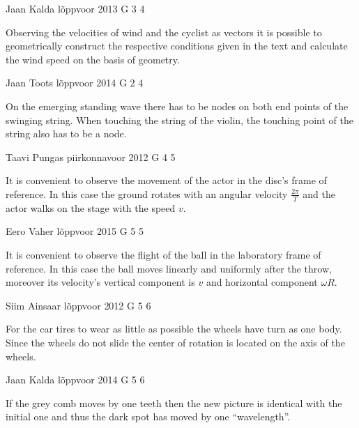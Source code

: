 \documentclass[11pt]{article}
\begin{document}
{Jaan Kalda} %
{lõppvoor} %
{2013} %
{G 3} %
{4} %
{

\ifEngHint
Observing the velocities of wind and the cyclist as vectors it is possible to geometrically construct the respective conditions given in the text and calculate the wind speed on the basis of geometry.
\fi
}

{Jaan Toots} %
{lõppvoor} %
{2014} %
{G 2} %
{4} %
{

\ifEngHint
On the emerging standing wave there has to be nodes on both end points of the swinging string. When touching the string of the violin, the touching point of the string also has to be a node.
\fi
}

{Taavi Pungas} %
{piirkonnavoor} %
{2012} %
{G 4} %
{5} %
{

\ifEngHint
It is convenient to observe the movement of the actor in the disc’s frame of reference. In this case the ground rotates with an angular velocity $\frac{2\pi}{T}$ and the actor walks on the stage with the speed $v$.
\fi
}

{Eero Vaher} %
{lõppvoor} %
{2015} %
{G 5} %
{5} %
{

\ifEngHint
It is convenient to observe the flight of the ball in the laboratory frame of reference. In this case the ball moves linearly and uniformly after the throw, moreover its velocity’s vertical component is $v$ and horizontal component $\omega R$.
\fi
}

{Siim Ainsaar} %
{lõppvoor} %
{2012} %
{G 5} %
{6} %
{

\ifEngHint
For the car tires to wear as little as possible the wheels have turn as one body. Since the wheels do not slide the center of rotation is located on the axis of the wheels.
\fi
}

{Jaan Kalda} %
{lõppvoor} %
{2014} %
{G 5} %
{6} %
{

\ifEngHint
If the grey comb moves by one teeth then the new picture is identical with the initial one and thus the dark spot has moved by one “wavelength”.
\fi
}
\end{document}
